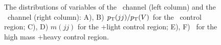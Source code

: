\begin{figure}[htbp]
{    
  }
  \caption[Control Region Distributions for the \WlnH\ Channels]{The distributions of variables of the \WenH\ channel (left column) and the \WmnH\ channel (right column): A), B) $p_{\mathrm{T}}(jj) / p_{\mathrm{T}}(V)$ for the \qrkt\qrktbar\ control region; C), D) $m(jj)$ for the \bosW+light control region; E), F) \btagmin\ for the high mass \bosW+heavy control region.}
  \label{fig:CR_Wln}
\end{figure}

\clearpage


